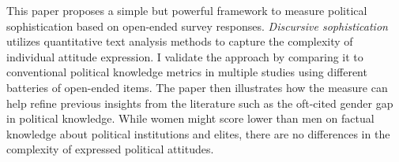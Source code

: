This paper proposes a simple but powerful framework to measure political sophistication based on open-ended survey responses. \textit{Discursive sophistication} utilizes quantitative text analysis methods to capture the complexity of individual attitude expression. I validate the approach by comparing it to conventional political knowledge metrics in multiple studies using different batteries of open-ended items. The paper then illustrates how the measure can help refine previous insights from the literature such as the oft-cited gender gap in political knowledge. While women might score lower than men on factual knowledge about political institutions and elites, there are no differences in the complexity of expressed political attitudes.